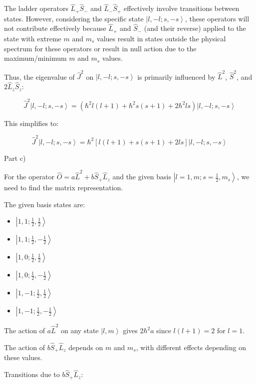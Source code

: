 The ladder operators \( \hat{L}_{+}\hat{S}_{-} \) and \( \hat{L}_{-}\hat{S}_{+} \) effectively involve transitions between states. However, considering the specific state \( \left|l, -l; s, -s \right> \), these operators will not contribute effectively because \( \hat{L}_{+} \) and \( \hat{S}_{-} \) (and their reverse) applied to the state with extreme \( m \) and \( m_{s} \) values result in states outside the physical spectrum for these operators or result in null action due to the maximum/minimum \( m \) and \( m_{s} \) values.

Thus, the eigenvalue of \( \hat{J}^2 \) on \( \left|l, -l; s, -s \right> \) is primarily influenced by \( \hat{L}^2 \), \( \hat{S}^2 \), and \( 2\hat{L}_{z}\hat{S}_{z} \):

\[
\hat{J}^2\left|l, -l; s, -s \right> = (\hbar^2 l(l+1) + \hbar^2 s(s+1) + 2\hbar^2 ls)\left|l, -l; s, -s \right>
\]

This simplifies to:

\[
\hat{J}^2\left|l, -l; s, -s \right> = \hbar^2 [l(l+1) + s(s+1) + 2ls]\left|l, -l; s, -s \right>
\]

Part c)

For the operator \( \hat{O} = a\hat{L}^2 + b\hat{S}_{+}\hat{L}_{z} \) and the given basis \( \left|l=1, m; s=\frac{1}{2}, m_{s} \right> \), we need to find the matrix representation.

The given basis states are:

\begin{itemize}
    \item \( \left|1, 1; \frac{1}{2}, \frac{1}{2} \right> \)
    \item \( \left|1, 1; \frac{1}{2}, -\frac{1}{2} \right> \)
    \item \( \left|1, 0; \frac{1}{2}, \frac{1}{2} \right> \)
    \item \( \left|1, 0; \frac{1}{2}, -\frac{1}{2} \right> \)
    \item \( \left|1, -1; \frac{1}{2}, \frac{1}{2} \right> \)
    \item \( \left|1, -1; \frac{1}{2}, -\frac{1}{2} \right> \)
\end{itemize}

The action of \( a\hat{L}^2 \) on any state \( \left|l, m \right> \) gives \( 2\hbar^2a \) since \( l(l+1) = 2 \) for \( l=1 \).

The action of \( b\hat{S}_{+}\hat{L}_{z} \) depends on \( m \) and \( m_{s} \), with different effects depending on these values.

Transitions due to \( b\hat{S}_{+}\hat{L}_{z} \):

